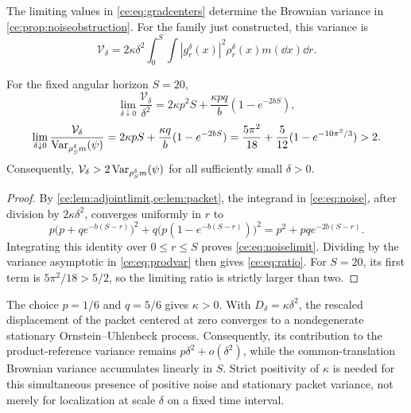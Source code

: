 \documentclass[11pt,reqno]{amsart}
\numberwithin{equation}{section}
\theoremstyle{plain}
\theoremstyle{remark}
\begin{document}
The limiting values in \eqref{ce:eq:gradcenters} determine the Brownian variance in \cref{ce:prop:noiseobstruction}. For the family just constructed, this variance is
\begin{equation}\label{ce:eq:noise}
 \mathcal V_\delta=2\kappa\delta^2\int_0^S
 \int|g^\delta_r(x)|^2\rho^\delta_r(x)m(\dd x)\dd r.
\end{equation}

\begin{prop}\label{ce:prop:noisecross}
For the fixed angular horizon $S=20$,
\begin{equation}\label{ce:eq:noiselimit}
 \lim_{\delta\downarrow0}\frac{\mathcal V_\delta}{\delta^2}
 =2\kappa p^2S+\frac{\kappa pq}{b}(1-e^{-2bS}),
\end{equation}
\begin{equation}\label{ce:eq:ratio}
 \lim_{\delta\downarrow0}\frac{\mathcal V_\delta}{\operatorname{Var}_{\rho^\delta_Sm}(\psi)}
 =2\kappa pS+\frac{\kappa q}{b}(1-e^{-2bS})
 =\frac{5\pi^2}{18}+\frac5{12}(1-e^{-10\pi^2/3})>2.
\end{equation}
Consequently, $\mathcal V_\delta>2\operatorname{Var}_{\rho^\delta_Sm}(\psi)$ for all sufficiently small $\delta>0$.
\end{prop}
\begin{proof}
By \cref{ce:lem:adjointlimit,ce:lem:packet}, the integrand in \eqref{ce:eq:noise}, after division by $2\kappa\delta^2$, converges uniformly in $r$ to
\begin{equation}\label{ce:eq:noisesquare}
 p\bigl(p+qe^{-b(S-r)}\bigr)^2+q\bigl(p(1-e^{-b(S-r)})\bigr)^2
 =p^2+pqe^{-2b(S-r)}.
\end{equation}
Integrating this identity over $0\le r\le S$ proves \eqref{ce:eq:noiselimit}. Dividing by the variance asymptotic in \eqref{ce:eq:prodvar} then gives \eqref{ce:eq:ratio}. For $S=20$, its first term is $5\pi^2/18>5/2$, so the limiting ratio is strictly larger than two.
\end{proof}

The choice $p=1/6$ and $q=5/6$ gives $\kappa>0$. With $D_\delta=\kappa\delta^2$, the rescaled displacement of the packet centered at zero converges to a nondegenerate stationary Ornstein--Uhlenbeck process. Consequently, its contribution to the product-reference variance remains $p\delta^2+o(\delta^2)$, while the common-translation Brownian variance accumulates linearly in $S$. Strict positivity of $\kappa$ is needed for this simultaneous presence of positive noise and stationary packet variance, not merely for localization at scale $\delta$ on a fixed time interval.
\end{document}
